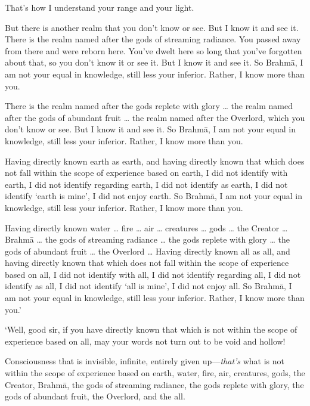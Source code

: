 \documentclass[12pt,openany]{book}%
\begin{document}
That’s how I understand your range and your light. 

But there is another realm that you don’t know or see. But I know it and see it. There is the realm named after the gods of streaming radiance. You passed away from there and were reborn here. You’ve dwelt here so long that you’ve forgotten about that, so you don’t know it or see it. But I know it and see it. So \textsanskrit{Brahmā}, I am not your equal in knowledge, still less your inferior. Rather, I know more than you. 

There is the realm named after the gods replete with glory … the realm named after the gods of abundant fruit … the realm named after the Overlord, which you don’t know or see. But I know it and see it. So \textsanskrit{Brahmā}, I am not your equal in knowledge, still less your inferior. Rather, I know more than you. 

Having directly known earth as earth, and having directly known that which does not fall within the scope of experience based on earth, I did not identify with earth, I did not identify regarding earth, I did not identify as earth, I did not identify ‘earth is mine’, I did not enjoy earth. So \textsanskrit{Brahmā}, I am not your equal in knowledge, still less your inferior. Rather, I know more than you. 

Having directly known water … fire … air … creatures … gods … the Creator … \textsanskrit{Brahmā} … the gods of streaming radiance … the gods replete with glory … the gods of abundant fruit … the Overlord … Having directly known all as all, and having directly known that which does not fall within the scope of experience based on all, I did not identify with all, I did not identify regarding all, I did not identify as all, I did not identify ‘all is mine’, I did not enjoy all. So \textsanskrit{Brahmā}, I am not your equal in knowledge, still less your inferior. Rather, I know more than you.’ 

‘Well, good sir, if you have directly known that which is not within the scope of experience based on all, may your words not turn out to be void and hollow! 

Consciousness that is invisible, infinite, entirely given up—\emph{that’s} what is not within the scope of experience based on earth, water, fire, air, creatures, gods, the Creator, \textsanskrit{Brahmā}, the gods of streaming radiance, the gods replete with glory, the gods of abundant fruit, the Overlord, and the all. 
\end{document}
